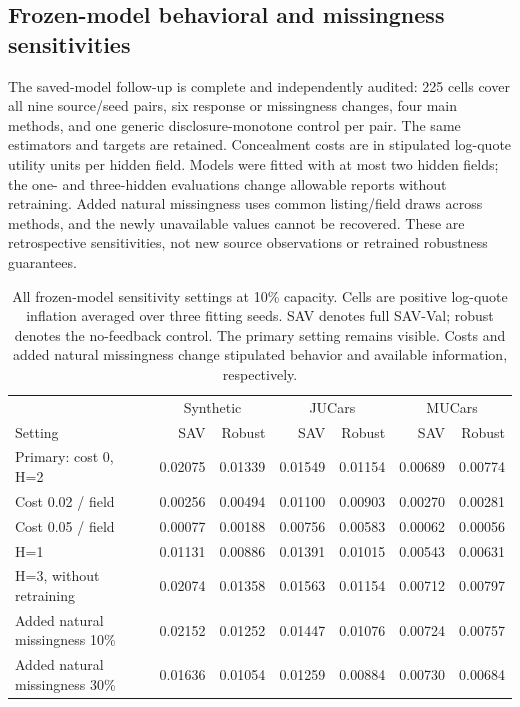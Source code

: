 \subsection{Frozen-model behavioral and missingness sensitivities}
The saved-model follow-up is complete and independently audited: 225 cells
cover all nine source/seed pairs, six response or missingness changes,
four main methods, and one generic disclosure-monotone control per pair.
The same estimators and targets are retained. Concealment costs are in
stipulated log-quote utility units per hidden field. Models were fitted
with at most two hidden fields; the one- and three-hidden evaluations
change allowable reports without retraining. Added natural missingness
uses common listing/field draws across methods, and the newly unavailable
values cannot be recovered. These are retrospective sensitivities,
not new source observations or retrained robustness guarantees.

\begin{table}[t]
\centering\small
\setlength{\tabcolsep}{4pt}
\caption{All frozen-model sensitivity settings at 10\% capacity. Cells
are positive log-quote inflation averaged over three fitting seeds.
SAV denotes full SAV-Val; robust denotes the no-feedback control.
The primary setting remains visible. Costs and added natural missingness
change stipulated behavior and available information, respectively.}
\label{tab:frozen_sensitivities}
\begin{tabular}{lrrrrrr}
\toprule
& \multicolumn{2}{c}{Synthetic} & \multicolumn{2}{c}{JUCars} & \multicolumn{2}{c}{MUCars}\\
Setting & SAV & Robust & SAV & Robust & SAV & Robust\\
\midrule
Primary: cost 0, H=2 & 0.02075 & 0.01339 & 0.01549 & 0.01154 & 0.00689 & 0.00774\\
Cost 0.02 / field & 0.00256 & 0.00494 & 0.01100 & 0.00903 & 0.00270 & 0.00281\\
Cost 0.05 / field & 0.00077 & 0.00188 & 0.00756 & 0.00583 & 0.00062 & 0.00056\\
H=1 & 0.01131 & 0.00886 & 0.01391 & 0.01015 & 0.00543 & 0.00631\\
H=3, without retraining & 0.02074 & 0.01358 & 0.01563 & 0.01154 & 0.00712 & 0.00797\\
Added natural missingness 10\% & 0.02152 & 0.01252 & 0.01447 & 0.01076 & 0.00724 & 0.00757\\
Added natural missingness 30\% & 0.01636 & 0.01054 & 0.01259 & 0.00884 & 0.00730 & 0.00684\\
\bottomrule
\end{tabular}
\end{table}

